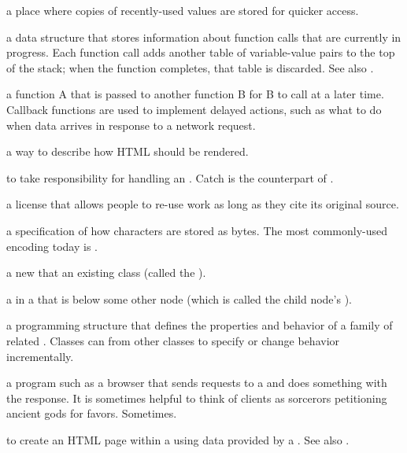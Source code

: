\begin{description}
a place where copies of recently-used values are stored for quicker access.

a data structure that stores information about function calls that are
currently in progress. Each function call adds another table of
variable-value pairs to the top of the stack; when the function completes,
that table is discarded. See also .

a function A that is passed to another function B for B to call at a later
time. Callback functions are used to implement delayed actions, such as what
to do when data arrives in response to a network request.

a way to describe how HTML should be rendered.

to take responsibility for handling an . Catch is
the counterpart of .

a license that allows people to re-use work as long as they cite its
original source.

a specification of how characters are stored as bytes. The most commonly-used
encoding today is .

a new  that  an existing class (called
the ).

a  in a  that is below some other node (which is
called the child node's ).

a programming structure that defines the properties and behavior of a family
of related . Classes can  from other
classes to specify or change behavior incrementally.

a program such as a browser that sends requests to a  and
does something with the response. It is sometimes helpful to think of clients
as sorcerors petitioning ancient gods for favors. Sometimes.

to create an HTML page within a  using data provided by a
. See also .


\end{description}
